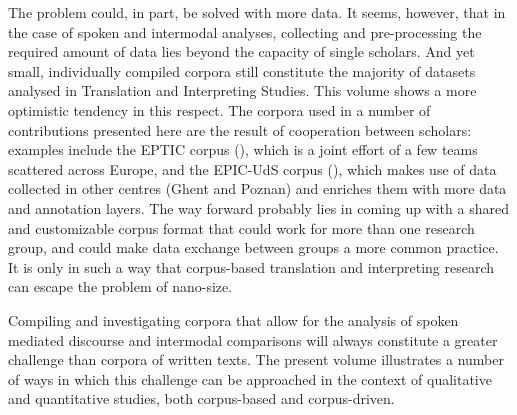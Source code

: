 \documentclass[output=paper]{langscibook}
\begin{document}
The problem could, in part, be solved with more data. It seems, however, that in the case of spoken and intermodal analyses, collecting and pre-processing the required amount of data lies beyond the capacity of single scholars. And yet small, individually compiled corpora still constitute the majority of datasets analysed in Translation and Interpreting Studies. This volume shows a more optimistic tendency in this respect. The corpora used in a number of contributions presented here are the result of cooperation between scholars: examples include the EPTIC corpus (\citealt{FerraresiBernardini2019}), which is a joint effort of a few teams scattered across Europe, and the EPIC-UdS corpus (), which makes use of data collected in other centres (Ghent and Poznan) and enriches them with more data and annotation layers. The way forward probably lies in coming up with a shared and customizable corpus format that could work for more than one research group, and could make data exchange between groups a more common practice. It is only in such a way that corpus-based translation and interpreting research can escape the problem of nano-size.

Compiling and investigating corpora that allow for the analysis of spoken mediated discourse and intermodal comparisons will always constitute a greater challenge than corpora of written texts. The present volume illustrates a number of ways in which this challenge can be approached in the context of qualitative and quantitative studies, both corpus-based and corpus-driven.

\printbibliography[heading=subbibliography,notkeyword=this]
\end{document}
